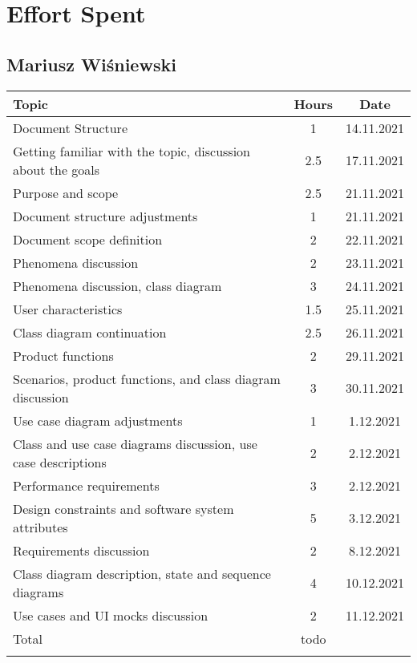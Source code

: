 \chapter{Effort Spent}

\section*{Mariusz Wiśniewski}
\begin{table}[H]
    \centering
    \begin{tabular}{lcc} \Xhline{1.5pt}
        Topic & Hours & Date\\ \hline
        Document Structure & 1 & 14.11.2021\\ 
        Getting familiar with the topic, discussion about the goals & 2.5 & 17.11.2021\\ 
        Purpose and scope & 2.5 & 21.11.2021\\ 
        Document structure adjustments & 1 & 21.11.2021\\
        Document scope definition & 2 & 22.11.2021\\
        Phenomena discussion & 2 & 23.11.2021\\
        Phenomena discussion, class diagram & 3 & 24.11.2021\\ 
        User characteristics & 1.5 & 25.11.2021\\ 
        Class diagram continuation & 2.5 & 26.11.2021 \\ 
        Product functions & 2 & 29.11.2021 \\
        Scenarios, product functions, and class diagram discussion & 3 & 30.11.2021\\
        Use case diagram adjustments & 1 & 1.12.2021\\
        Class and use case diagrams discussion, use case descriptions & 2 & 2.12.2021\\ 
        Performance requirements & 3 & 2.12.2021\\
        Design constraints and software system attributes & 5 & 3.12.2021\\
        Requirements discussion & 2 & 8.12.2021\\
        Class diagram description, state and sequence diagrams & 4 & 10.12.2021\\ 
        Use cases and UI mocks discussion & 2 & 11.12.2021\\
        \hline
        Total & todo &\\ \Xhline{1.5pt}
    \end{tabular}
\end{table}


